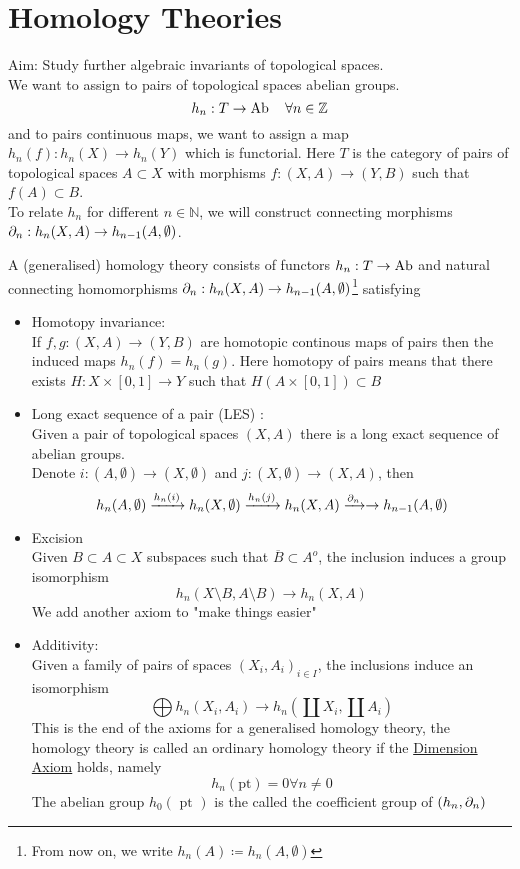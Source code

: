 \documentclass[../main.tex]{subfiles}
\begin{document}
\section{Homology Theories}

Aim: Study further algebraic invariants of topological spaces.\\
We want to assign to pairs of topological spaces abelian groups.
\[ 
h_n: T \to \operatorname{Ab} \quad \forall n \in \mathbb{Z}	
\]
and to pairs continuous maps, we want to assign a map $h_n( f) :h_n( X) \to h_n( Y) $ which is functorial.
Here $T$ is the category of pairs of topological spaces $A \subset X$ with morphisms $f:( X,A) \to ( Y,B) $ such that $f( A) \subset B$.\\
To relate $h_n$ for different $n\in \mathbb{N}$, we will construct connecting morphisms $\partial_n: h_n ( X,A) \to h_{n-1} ( A, \emptyset) $.
\begin{axiom}
	A (generalised) homology theory consists of functors $h_n: T\to \operatorname{Ab}$ and natural connecting homomorphisms $\partial_n: h_n( X,A) \to h_{n-1} ( A,\emptyset)  $\footnote{ From now on, we write $h_n( A ) \coloneqq h_n( A,\emptyset)  $}  satisfying
\begin{itemize}
\item Homotopy invariance:\\ If $f,g:( X,A) \to ( Y,B) $ are homotopic continous maps of pairs then the induced maps $h_n( f) = h_n( g)  $.
	Here homotopy of pairs means that there exists $H:X\times [ 0,1] \to Y$ such that $H( A\times [ 0,1] ) \subset B$
\item Long exact sequence of a pair (LES) :\\
	Given a pair of topological spaces $( X,A) $ there is a long exact sequence of abelian groups.\\
	Denote $i:( A,\emptyset) \to ( X,\emptyset) $ and $j:( X,\emptyset )\to ( X,A)  $, then
	\[ 
		h_n( A,\emptyset ) \xrightarrow { h_n( i)  } h_n( X,\emptyset) \xrightarrow{  h_n( j)  } h_n( X,A) \xrightarrow{ \partial_{n} } \to h_{n-1} ( A,\emptyset) 
	\]

\item Excision\\
	Given $B \subset A \subset X$ subspaces such that $\overline{B} \subset A^{o}	$, the inclusion induces a group isomorphism
	\[ 
	h_n( X\setminus B, A\setminus B)  \to h_n( X,A) 
	\]
	We add another axiom to "make things easier"

\item Additivity:\\
	Given a family of pairs of spaces  $( X_i,A_i) _{i \in I} $, the inclusions induce an isomorphism
	\[ 
	\bigoplus h_n ( X_i,A_i) \to h_n( \coprod X_i, \coprod A_i)  
\]
This is the end of the axioms for a generalised homology theory, the homology theory is called an ordinary homology theory if the \underline { Dimension Axiom} holds, namely
\[ 
	h_n( \text{pt}) =0 \forall n \neq 0
\]
The abelian group $h_0( \text{ pt } ) $ is the called the coefficient group of $( h_n,\partial_n) $ 
\end{itemize}
\end{axiom}
\end{document}
